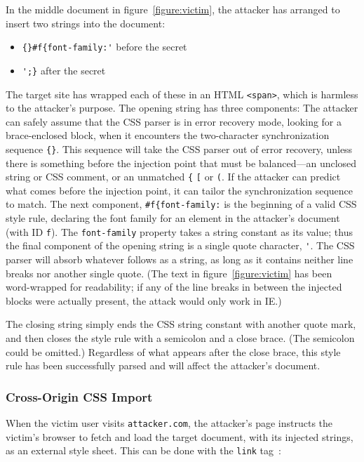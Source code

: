\documentclass{acm_proc_article-sp}
\begin{document}
In the middle document in figure~\ref{figure:victim}, the attacker has
arranged to insert two strings into the document:
\begin{itemize}
\item \verb|{}#f{font-family:'| before the secret
\item \verb|';}| after the secret
\end{itemize}
The target site has wrapped each of these in an HTML \verb|<span>|,
which is harmless to the attacker's purpose.  The opening string has
three components: The attacker can safely assume that the CSS parser
is in error recovery mode, looking for a brace-enclosed block, when it
encounters the two-character synchronization sequence \verb|{}|.  This
sequence will take the CSS parser out of error recovery, unless there
is something before the injection point that must be balanced---an
unclosed string or CSS comment, or an unmatched \verb|{| \verb|[| or
\verb|(|.  If the attacker can predict what comes before the injection
point, it can tailor the synchronization sequence to match.  The next
component, \verb|#f{font-family:| is the beginning of a valid CSS
style rule, declaring the font family for an element in the attacker's
document (with ID \texttt{f}).  The \texttt{font-family} property
takes a string constant as its value; thus the final component of the
opening string is a single quote character, \verb|'|.  The CSS parser
will absorb whatever follows as a string, as long as it contains
neither line breaks nor another single quote.  (The text in
figure~\ref{figure:victim} has been word-wrapped for readability; if
any of the line breaks in between the injected blocks were actually
present, the attack would only work in IE.)

The closing string simply ends the CSS string constant with another
quote mark, and then closes the style rule with a semicolon and a
close brace.  (The semicolon could be omitted.)  Regardless of what
appears after the close brace, this style rule has been successfully
parsed and will affect the attacker's document.

\subsubsection{Cross-Origin CSS Import}
When the victim user visits \texttt{attacker.com}, the attacker's page
instructs the victim's browser to fetch and load the target document,
with its injected strings, as an external style sheet.  This can be
done with the \texttt{link} tag~\cite{html}:
\end{document}
